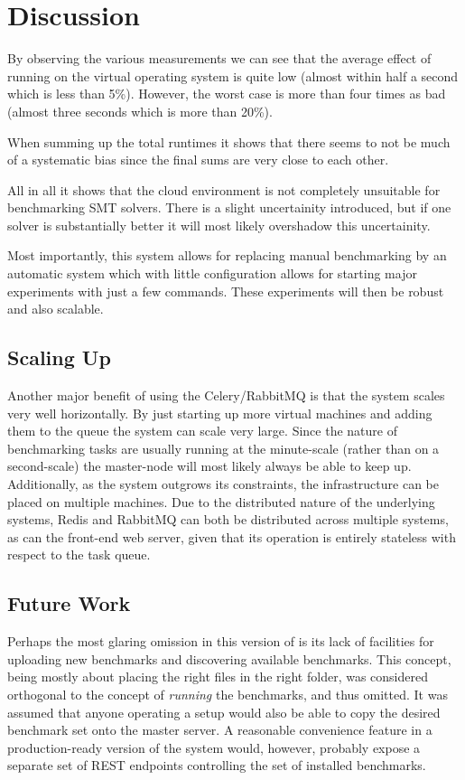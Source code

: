 \documentclass[a4paper]{IEEEtran}
\begin{document}
\section{Discussion}
By observing the various measurements we can see that the average
effect of running on the virtual operating system is quite low (almost
within half a second which is less than 5\%). However, the worst case
is more than four times as bad (almost three seconds which is more
than 20\%).

When summing up the total runtimes it shows that there seems to not be
much of a systematic bias since the final sums are very close to each
other.

All in all it shows that the cloud environment is not completely
unsuitable for benchmarking SMT solvers. There is a slight
uncertainity introduced, but if one solver is substantially better it
will most likely overshadow this uncertainity.

Most importantly, this system allows for replacing manual benchmarking
by an automatic system which with little configuration allows for
starting major experiments with just a few commands. These experiments
will then be robust and also scalable. 

\subsection{Scaling Up}
Another major benefit of using the Celery/RabbitMQ is that the system
scales very well horizontally. By just starting up more virtual
machines and adding them to the queue the system can scale very
large. Since the nature of benchmarking tasks are usually running at
the minute-scale (rather than on a second-scale) the master-node will
most likely always be able to keep up. Additionally, as the system outgrows its
constraints, the infrastructure can be placed on multiple machines. Due to the
distributed nature of the underlying systems, Redis and RabbitMQ can both be
distributed across multiple systems, as can the front-end web server, given that
its operation is entirely stateless with respect to the task queue.

\subsection{Future Work}

Perhaps the most glaring omission in this version of \testbench{} is its lack of
facilities for uploading new benchmarks and discovering available benchmarks.
This concept, being mostly about placing the right files in the right folder,
was considered orthogonal to the concept of \emph{running} the benchmarks, and
thus omitted. It was assumed that anyone operating a \testbench{} setup would
also be able to copy the desired benchmark set onto the master server. A
reasonable convenience feature in a production-ready version of the system
would, however, probably expose a separate set of REST endpoints controlling the
set of installed benchmarks.
\end{document}
